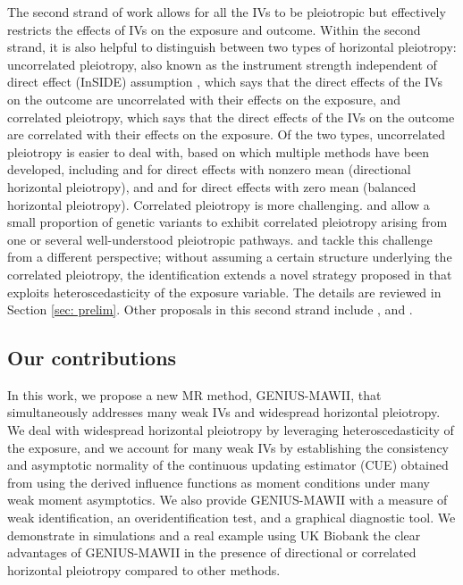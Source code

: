 \documentclass[12pt]{article}
\begin{document}
The second strand of work allows for all the IVs to be pleiotropic but effectively restricts the effects of IVs on the exposure and outcome. Within the second strand,  it is also helpful to distinguish between two types of horizontal pleiotropy: uncorrelated pleiotropy, also known as the  instrument strength independent of direct effect (InSIDE) assumption \citep{Bowden:2015aa}, which says that the direct effects of the IVs on the outcome are uncorrelated with their effects on the exposure, and correlated pleiotropy, which says that the direct effects of the IVs on the outcome are correlated with their effects on the exposure. Of the two types, uncorrelated pleiotropy is easier to deal with, based on which  multiple methods have been developed, including \cite{Kolesar:2015aa} and \cite{Bowden:2015aa} for direct effects with  nonzero mean (directional horizontal pleiotropy), and  \cite{Zhao:2019aa, zhao2018statistical} and {\cite{ye2021debiased}} for direct effects with zero mean (balanced horizontal pleiotropy). Correlated  pleiotropy is more challenging.   \cite{morrison2020ng}  and {\cite{wang2021causal}}  allow a small proportion of genetic variants to exhibit correlated pleiotropy arising from one or several well-understood pleiotropic pathways.  \cite{Tchetgen2019_GENIUS} and \cite{sun2022selective} tackle this challenge from a different perspective; without assuming a certain structure underlying the correlated pleiotropy, the identification extends a novel strategy proposed in \cite{Lewbel:2012aa, Lewbel:2018aa} that exploits heteroscedasticity of the exposure variable. The details are reviewed in Section \ref{sec: prelim}. Other proposals in this second strand include  \cite{Burgess:2015ac}, \cite{Spiller:2019aa}  and {\cite{liu2020mendelian}}. 

\vspace{-3mm}
\subsection{Our contributions} 
\label{subsec: contribution}
In this work, we propose a new MR method, GENIUS-MAWII, that simultaneously addresses many weak IVs and widespread horizontal pleiotropy. We deal with widespread horizontal pleiotropy by leveraging heteroscedasticity of the exposure, and we account for   many weak IVs by establishing the consistency and asymptotic normality of  the continuous updating estimator (CUE) obtained from using the derived influence functions as moment conditions under many weak moment asymptotics. We also provide GENIUS-MAWII with a measure of weak identification, an overidentification test, and a graphical diagnostic tool.  We demonstrate in simulations and a real example using UK Biobank  the clear advantages of  GENIUS-MAWII in the presence of directional or correlated horizontal pleiotropy compared to other methods. 
\end{document}
